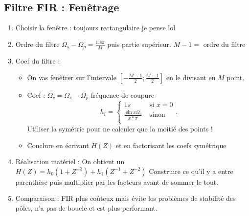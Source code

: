 \documentclass[9pt]{article}
\begin{document}
\begin{multicols}{3}
\subsection{Filtre FIR : Fenêtrage}
\begin{enumerate}
    \item Choisir la fenêtre : toujours rectangulaire je pense lol
    \item Ordre du filtre $ \Omega _s - \Omega _p = \frac{1.8 \pi }{M} $ puis partie supérieur. $ M - 1 =  $ ordre du filtre
    \item Coef du filtre : \begin{itemize}
        \item On vas fenêtrer sur l'intervale $ [-\frac{M-1}{2} ; \frac{M-1}{2}] $ en le divisant en $ M $ point.
        \item Coef : $ \Omega _c = \Omega _s - \Omega _p $ fréquence de coupure 
        \[
            h_i = \begin{cases}
                1s &\text{ si } x = 0\\
                \frac{\sin x \Omega _c}{x*\pi } &\text{ sinon}\\
                \end{cases}  
        .\]
        Utiliser la symétrie pour ne calculer que la moitié des points !
        \item Conclure en écrivant $ H(Z) $ et en factorisant les coefs symétrique
    \end{itemize}
    \item Réalisation matériel : On obtient un $ H(Z) = h_0(1+Z^{-3}) + h_1 (Z^{-1} + Z^{-2})$ Construire ce qu'il y a entre parenthèse puis multiplier par les facteurs avant de sommer le tout.
    \item Comparaison : FIR plus coûteux mais évite les problèmes de stabilité des pôles, n'a pas de boucle et est plus performant.
\end{enumerate}

\end{multicols}
\end{document}
